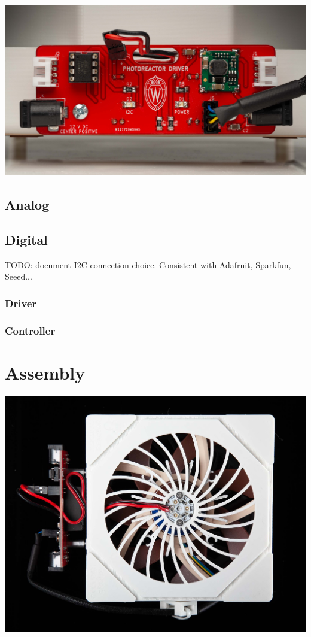 \documentclass[11pt]{article}
\let\stdsection\section
\renewcommand\section{\clearpage\stdsection}
\begin{document}
\includegraphics[width=\textwidth]{"./electronics-coverart.jpg"}

\subsection{Analog}



\subsection{Digital}

TODO: document I2C connection choice.
Consistent with Adafruit, Sparkfun, Seeed...

\subsubsection{Driver}



\subsubsection{Controller}

\section{Assembly}

\includegraphics[width=\textwidth]{"./assembly-coverart.jpg"}
\end{document}
